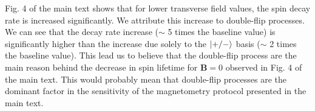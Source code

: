\documentclass[preprintnumbers,amsmath,amssymb,onecolumn,12pt]{revtex4-2}\usepackage{graphicx}%
\begin{document}
Fig. 4 of the main text shows that for lower transverse field values, the spin decay rate is increased significantly. We attribute this increase to double-flip processes. We can see that the decay rate increase ($\sim$ 5 times the baseline value) is significantly higher than the increase due solely to the $\ket{+/-}$ basis ($\sim$ 2 times the baseline value). This lead us to believe that the double-flip process are the main reason behind the decrease in spin lifetime for $\bm B=0$ observed in Fig. 4 of the main text. This would probably mean that double-flip processes are the dominant factor in the sensitivity of the magnetometry protocol presented in the main text.


{}
\end{document}

